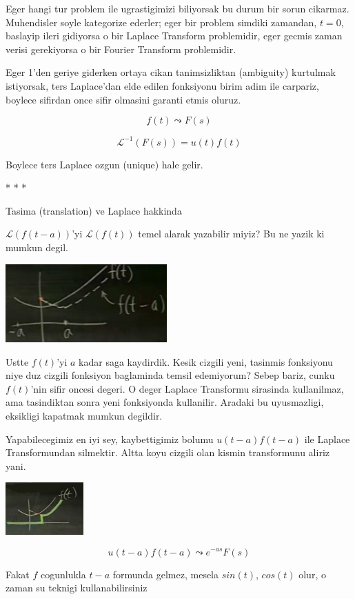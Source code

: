\documentclass[12pt,fleqn]{article}
\begin{document}
Eger hangi tur problem ile ugrastigimizi biliyorsak bu durum bir sorun
cikarmaz. Muhendisler soyle kategorize ederler; eger bir problem simdiki
zamandan, $t=0$, baslayip ileri gidiyorsa o bir Laplace Transform
problemidir, eger gecmis zaman verisi gerekiyorsa o bir Fourier Transform
problemidir. 

Eger 1'den geriye giderken ortaya cikan tanimsizliktan (ambiguity)
kurtulmak istiyorsak, ters Laplace'dan elde edilen fonksiyonu birim adim
ile carpariz, boylece sifirdan once sifir olmasini garanti etmis oluruz. 

\[ f(t) \leadsto F(s) \]

\[ \mathcal{L}^{-1}(F(s)) = u(t)f(t) \]

Boylece ters Laplace ozgun (unique) hale gelir.

* * * 

Tasima (translation) ve Laplace hakkinda

$\mathcal{L}(f(t-a))$'yi $\mathcal{L}(f(t))$ temel alarak yazabilir miyiz?
Bu ne yazik ki mumkun degil. 

\includegraphics[height=3cm]{22_7.png}

Ustte $f(t)$'yi $a$ kadar saga kaydirdik. Kesik cizgili yeni, tasinmis
fonksiyonu niye duz cizgili fonksiyon baglaminda temsil edemiyorum? Sebep
bariz, cunku $f(t)$'nin sifir oncesi degeri. O deger Laplace Transformu
sirasinda kullanilmaz, ama tasindiktan sonra yeni fonksiyonda
kullanilir. Aradaki bu uyusmazligi, eksikligi kapatmak mumkun degildir. 

Yapabilecegimiz en iyi sey, kaybettigimiz bolumu $u(t-a)f(t-a)$ ile Laplace
Transformundan silmektir. Altta koyu cizgili olan kismin transformunu
aliriz yani.

\includegraphics[height=2cm]{22_8.png}

\[ u(t-a)f(t-a) \leadsto e^{-as}F(s) \]

Fakat $f$ cogunlukla $t-a$ formunda gelmez, mesela $sin(t)$, $cos(t)$
olur, o zaman su teknigi kullanabilirsiniz
\end{document}
